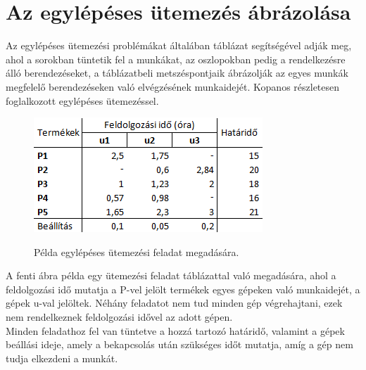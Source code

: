 \documentclass {report}
\begin{document}
\section{Az egylépéses ütemezés ábrázolása}
Az egylépéses ütemezési problémákat általában táblázat segítségével adják meg, ahol a sorokban tüntetik fel a munkákat, az oszlopokban pedig a rendelkezésre álló berendezéseket, a táblázatbeli metszéspontjaik ábrázolják az egyes munkák megfelelő berendezéseken való elvégzésének munkaidejét. Kopanos részletesen foglalkozott egylépéses ütemezéssel. \\
\begin{figure}[h]
\begin{center}
\includegraphics{tablazat1}\\
\caption{Példa egylépéses ütemezési feladat megadására.}
\end{center}
\end{figure}

A fenti ábra példa egy ütemezési feladat táblázattal való megadására, ahol a feldolgozási idő mutatja a P-vel jelölt termékek egyes gépeken való munkaidejét, a gépek u-val jelöltek. Néhány feladatot nem tud minden gép végrehajtani, ezek nem rendelkeznek feldolgozási idővel az adott gépen. \\
Minden feladathoz fel van tüntetve a hozzá tartozó határidő, valamint a gépek beállási ideje, amely a bekapcsolás után szükséges időt mutatja, amíg a gép nem tudja elkezdeni a munkát. 
\end{document}
